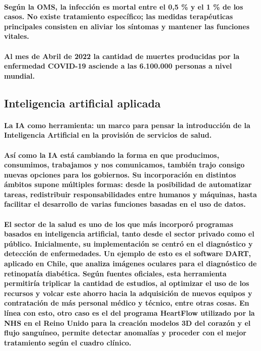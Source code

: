 \documentclass[a4paper,11pt,twocolumn]{article}
\begin{document}
\paragraph{Según la OMS, la infección es mortal entre el 0,5 \% y el 1 \% de los casos. No existe tratamiento específico; las medidas terapéuticas principales consisten en aliviar los síntomas y mantener las funciones vitales.}
\paragraph{Al mes de Abril de 2022 la cantidad de muertes producidas por la enfermedad COVID-19 asciende a las 6.100.000 personas a nivel mundial\cite{hopkins-map}.}
\subsection{Inteligencia artificial aplicada}
\paragraph{La IA como herramienta: un marco para pensar la introducción de la Inteligencia Artificial en la provisión de servicios de salud.}
\paragraph{Así como la IA está cambiando la forma en que producimos, consumimos, trabajamos y nos comunicamos, también trajo consigo nuevas opciones para los gobiernos. Su incorporación en distintos ámbitos supone múltiples formas: desde la posibilidad de automatizar tareas, redistribuir responsabilidades entre humanos y máquinas, hasta facilitar el desarrollo de varias funciones basadas en el uso de datos.}
\paragraph{El sector de la salud es uno de los que más incorporó programas basados en inteligencia artificial, tanto desde el sector privado como el público. Inicialmente, su implementación se centró en el diagnóstico y detección de enfermedades. Un ejemplo de esto es el software DART, aplicado en Chile, que analiza imágenes oculares para el diagnóstico de retinopatía diabética. Según fuentes oficiales, esta herramienta permitiría triplicar la cantidad de estudios, al optimizar el uso de los recursos y volcar este ahorro hacia la adquisición de nuevos equipos y contratación de más personal médico y técnico, entre otras cosas. En línea con esto, otro caso es el del programa HeartFlow utilizado por la NHS en el Reino Unido para la creación modelos 3D del corazón y el flujo sanguíneo, permite detectar anomalías y proceder con el mejor tratamiento según el cuadro clínico.}
\end{document}
